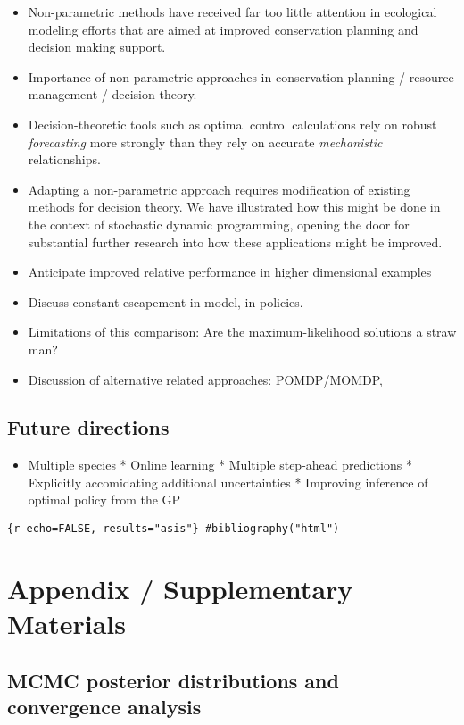 \documentclass[author-year, review]{elsarticle} %
\begin{document}
\begin{itemize}
\item
  Non-parametric methods have received far too little attention in
  ecological modeling efforts that are aimed at improved conservation
  planning and decision making support.
\item
  Importance of non-parametric approaches in conservation planning /
  resource management / decision theory.
\item
  Decision-theoretic tools such as optimal control calculations rely on
  robust \emph{forecasting} more strongly than they rely on accurate
  \emph{mechanistic} relationships.
\item
  Adapting a non-parametric approach requires modification of existing
  methods for decision theory. We have illustrated how this might be
  done in the context of stochastic dynamic programming, opening the
  door for substantial further research into how these applications
  might be improved.
\item
  Anticipate improved relative performance in higher dimensional
  examples
\item
  Discuss constant escapement in model, in policies.
\item
  Limitations of this comparison: Are the maximum-likelihood solutions a
  straw man?
\item
  Discussion of alternative related approaches: POMDP/MOMDP,
\end{itemize}

\subsection{Future directions}

\begin{itemize}
\itemsep1pt\parskip0pt
\item
  Multiple species * Online learning * Multiple step-ahead predictions *
  Explicitly accomidating additional uncertainties * Improving inference
  of optimal policy from the GP
\end{itemize}

\texttt{\{r echo=FALSE, results="asis"\} \#bibliography("html")}

\section{Appendix / Supplementary Materials}

\subsection{MCMC posterior distributions and convergence analysis}
\end{document}
